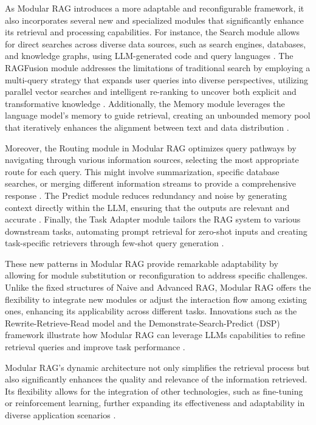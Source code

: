 As Modular RAG introduces a more adaptable and reconfigurable framework, it also incorporates several new and specialized modules that significantly enhance its retrieval and processing capabilities. For instance, the Search module allows for direct searches across diverse data sources, such as search engines, databases, and knowledge graphs, using LLM-generated code and query languages \cite{wang2023knowledgpt}. The RAGFusion module addresses the limitations of traditional search by employing a multi-query strategy that expands user queries into diverse perspectives, utilizing parallel vector searches and intelligent re-ranking to uncover both explicit and transformative knowledge \cite{ragfusion2023}. Additionally, the Memory module leverages the language model’s memory to guide retrieval, creating an unbounded memory pool that iteratively enhances the alignment between text and data distribution \cite{cheng2024lift}.

Moreover, the Routing module in Modular RAG optimizes query pathways by navigating through various information sources, selecting the most appropriate route for each query. This might involve summarization, specific database searches, or merging different information streams to provide a comprehensive response \cite{li2023classification}. The Predict module reduces redundancy and noise by generating context directly within the LLM, ensuring that the outputs are relevant and accurate \cite{yu2022generate}. Finally, the Task Adapter module tailors the RAG system to various downstream tasks, automating prompt retrieval for zero-shot inputs and creating task-specific retrievers through few-shot query generation \cite{cheng2023uprise}.

These new patterns in Modular RAG provide remarkable adaptability by allowing for module substitution or reconfiguration to address specific challenges. Unlike the fixed structures of Naive and Advanced RAG, Modular RAG offers the flexibility to integrate new modules or adjust the interaction flow among existing ones, enhancing its applicability across different tasks. Innovations such as the Rewrite-Retrieve-Read model and the Demonstrate-Search-Predict (DSP) framework illustrate how Modular RAG can leverage LLMs capabilities to refine retrieval queries and improve task performance \cite{khattab2022demonstrate}.

Modular RAG’s dynamic architecture not only simplifies the retrieval process but also significantly enhances the quality and relevance of the information retrieved. Its flexibility allows for the integration of other technologies, such as fine-tuning or reinforcement learning, further expanding its effectiveness and adaptability in diverse application scenarios \cite{gao2023retrieval}.

